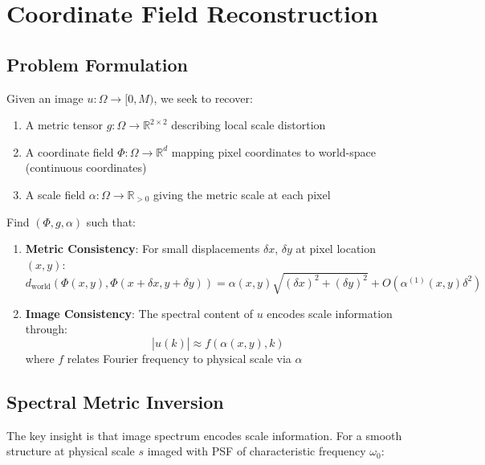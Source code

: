 \documentclass[twocolumn,11pt]{article}
\begin{document}
\section{Coordinate Field Reconstruction}

\subsection{Problem Formulation}

Given an image $u: \Omega \to [0, M)$, we seek to recover:
\begin{enumerate}
\item A metric tensor $g: \Omega \to \mathbb{R}^{2 \times 2}$ describing local scale distortion
\item A coordinate field $\Phi: \Omega \to \mathbb{R}^d$ mapping pixel coordinates to world-space (continuous coordinates)
\item A scale field $\alpha: \Omega \to \mathbb{R}_{>0}$ giving the metric scale at each pixel
\end{enumerate}

\begin{definition}
Find $(\Phi, g, \alpha)$ such that:
\begin{enumerate}
\item \textbf{Metric Consistency}: For small displacements $\delta x$, $\delta y$ at pixel location $(x,y)$:
\begin{equation}
d_{\text{world}}(\Phi(x,y), \Phi(x+\delta x, y+\delta y)) = \alpha(x,y) \sqrt{(\delta x)^2 + (\delta y)^2} + O(\alpha^{(1)}(x,y) \delta^2)
\end{equation}

\item \textbf{Image Consistency}: The spectral content of $u$ encodes scale information through:
\begin{equation}
|\hat{u}(k)| \approx f(\alpha(x,y), k)
\end{equation}
where $f$ relates Fourier frequency to physical scale via $\alpha$
\end{enumerate}
\end{definition}

\subsection{Spectral Metric Inversion}

The key insight is that image spectrum encodes scale information. For a smooth structure at physical scale $s$ imaged with PSF of characteristic frequency $\omega_0$:
\end{document}
